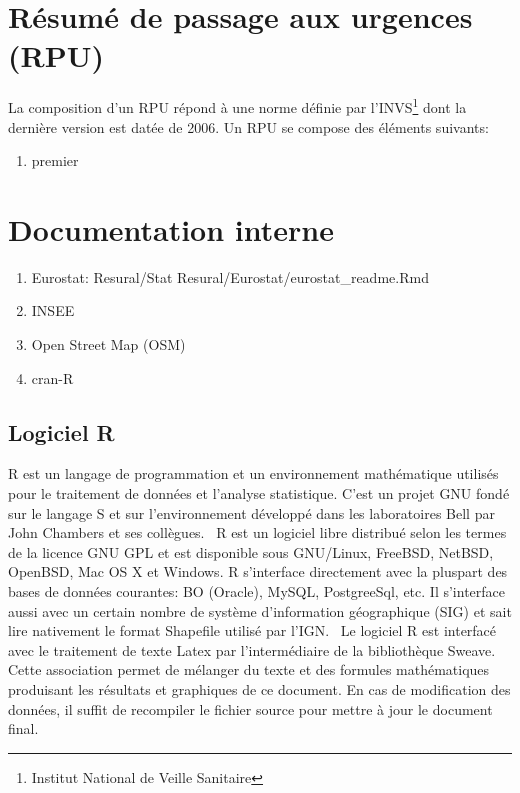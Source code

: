 \documentclass[12pt,english,french]{report}
\begin{document}
\chapter{Résumé de passage aux urgences (RPU)}
La composition d'un RPU répond à une norme définie par l'INVS\footnote{Institut National de Veille Sanitaire} dont la dernière version est datée de 2006. Un RPU se compose des éléments suivants:
\begin{enumerate}
  \item premier
\end{enumerate}

\chapter{Documentation interne}
\begin{enumerate}
  \item Eurostat: Resural\//Stat Resural\//Eurostat\//eurostat\_readme.Rmd
  \item INSEE
  \item Open Street Map (OSM)
  \item cran-R
\end{enumerate}

\section{Logiciel R}
R est un langage de programmation et un environnement mathématique utilisés pour le traitement de données et l'analyse statistique. C'est un projet GNU fondé sur le langage S et sur l'environnement développé dans les laboratoires Bell par John Chambers et ses collègues. 
\
R est un logiciel libre distribué selon les termes de la licence GNU GPL et est disponible sous GNU/Linux, FreeBSD, NetBSD, OpenBSD, Mac OS X et Windows. R s'interface directement avec la pluspart des bases de données courantes: BO (Oracle), MySQL, PostgreeSql, etc. Il s'interface aussi avec un certain nombre de système d'information géographique (SIG) et sait lire nativement le format Shapefile utilisé par l'IGN.
\
Le logiciel R est interfacé avec le traitement de texte Latex par l'intermédiaire de la bibliothèque Sweave. Cette association permet de mélanger du texte et des formules mathématiques produisant les résultats et graphiques de ce document. En cas de modification des données, il suffit de recompiler le fichier source pour mettre à jour le document final.
\

\printindex
\end{document}
